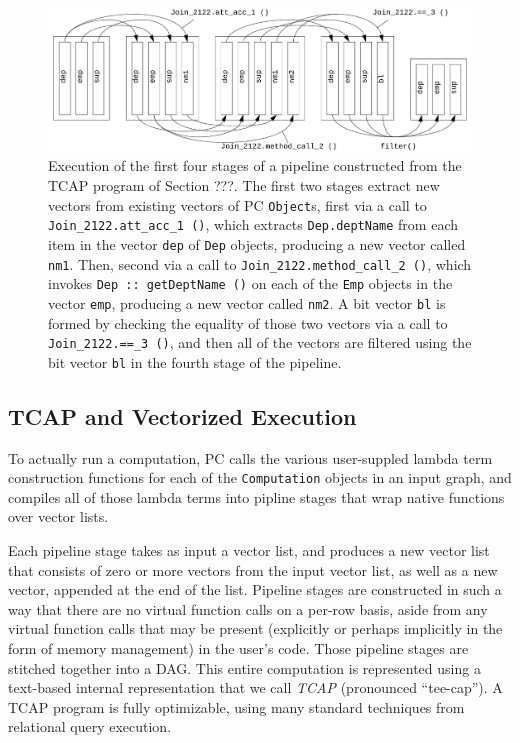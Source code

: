 \begin{figure}[t]
  \begin{center}
    \includegraphics[width=6in]{TCAP}
  \end{center}
\vspace{-10 pt}
  \caption{Execution of the first four stages of a pipeline constructed from the TCAP program of Section ???.  The first two stages extract new vectors from 
existing vectors of PC \texttt{Object}s, first via a call to \texttt{Join\_2122.att\_acc\_1 ()}, which extracts \texttt{Dep.deptName} from each item in the vector
\texttt{dep} 
of \texttt{Dep} objects, producing a new vector called \texttt{nm1}. Then, second
via a call to \texttt{Join\_2122.method\_call\_2 ()}, which invokes \texttt{Dep :: getDeptName ()} on each of the \texttt{Emp} objects
in the vector \texttt{emp}, producing a new vector called \texttt{nm2}.  A bit vector \texttt{bl} is formed by checking the equality of those two 
vectors via a call to \texttt{Join\_2122.==\_3 ()}, and then all of the vectors are filtered using the bit vector \texttt{bl} in the fourth stage of the pipeline.}
  \label{fig:TCAP}
\end{figure}

\subsection{TCAP and Vectorized Execution} \label{sec:vectorized}

To actually run a computation, PC calls the various user-suppled lambda term construction functions for each of the \texttt{Computation} objects in an
input graph, and compiles all of those lambda terms into pipline stages that wrap native functions over vector lists.  

Each pipeline stage
takes as input a vector list,
and produces a 
new vector list that consists of zero or more vectors from the input vector list, as well as a new vector, appended at the end of the list.
Pipeline stages are constructed in such a way that there are no virtual function calls on a per-row basis, aside from any virtual function calls that may be
present (explicitly or perhaps implicitly in the form of memory management) in the user's code.
Those pipeline stages are stitched together into a DAG.
This entire computation is represented using a text-based internal representation that we call
\emph{TCAP} (pronounced ``tee-cap'').  A TCAP program is fully optimizable, using many standard techniques from relational query execution.

